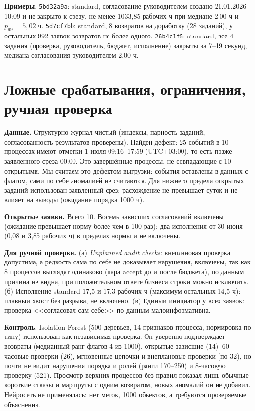 \documentclass[10pt,a4paper]{article}
\begin{document}
\textbf{Примеры.} \texttt{5bd32a9a}: standard, согласование руководителем создано 21.01.2026 10:09 и не закрыто к срезу, не менее 1033,85 рабочих ч при медиане 2,00 ч и $p_{99}=5{,}02$ ч. \texttt{5d7cf7bb}: standard, 8 возвратов на доработку (28 заданий), у остальных 992 заявок возвратов не более одного. \texttt{26b4c1f5}: standard, все 4 задания (проверка, руководитель, бюджет, исполнение) закрыты за 7--19 секунд, медиана согласования руководителем 2,00 ч.

\section{Ложные срабатывания, ограничения, ручная проверка}
\textbf{Данные.} Структурно журнал чистый (индексы, парность заданий, согласованность результатов проверены). Найден дефект: 25 событий в 10 процессах имеют отметки 1 июля 09:16--17:59 (UTC+03:00), то есть позже заявленного среза 00:00. Это завершённые процессы, не совпадающие с 10 открытыми. Мы считаем это дефектом выгрузки: события оставлены в данных с флагом, сами по себе аномалией не считаются. Для нижнего предела открытых заданий использован заявленный срез; расхождение не превышает суток и не влияет на выводы (ожидание порядка 1000 ч).

\textbf{Открытые заявки.} Всего 10. Восемь зависших согласований включены (ожидание превышает норму более чем в 100 раз); два исполнения от 30 июня (0,08 и 3,85 рабочих ч) в пределах нормы и не включены.

\textbf{Для ручной проверки.} (а) \emph{Unplanned audit checks}: внеплановая проверка допустима, а редкость сама по себе не доказывает нарушения; включены, так как 8 процессов выглядят одинаково (пара accept до и после бюджета), по данным причина не видна, при положительном ответе бизнеса строки можно исключить. (б) Исполнение standard 17,5 и 17,3 рабочих ч (максимум остальных 14,5 ч): плавный хвост без разрыва, не включено. (в) Единый инициатор у всех заявок: проверка <<согласовал сам себе>> по данным малоинформативна.

\textbf{Контроль.} Isolation Forest (500 деревьев, 14 признаков процесса, нормировка по типу) использован как независимая проверка. Он уверенно подтверждает возвраты (медианный ранг флагов 4 из 1000), открытые зависшие (14), 60-часовые проверки (26), мгновенные цепочки и внеплановые проверки (по 32), но почти не видит нарушения порядка и ролей (ранги 170--250) и 8-часовую проверку (521). Просмотр верхних процессов без правил показал лишь обычные короткие отказы и маршруты с одним возвратом, новых аномалий он не добавил. Нейросеть не применялась: нет меток, 1000 объектов, а требуются проверяемые объяснения.
\end{document}

